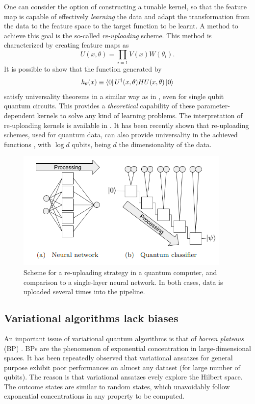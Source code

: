 \documentclass[]{report}
\begin{document}
One can consider the option of constructing a tunable kernel, so that the feature map is capable of effectively \textit{learning} the data and adapt the transformation from the data to the feature space to the target function to be learnt. A method to achieve this goal is the so-called \textit{re-uploading} scheme. This method is characterized by creating feature maps as
\begin{equation}
U(x, \theta) = \prod_{i = 1} V(x) W(\theta_i). 
\end{equation}
It is possible to show that the function generated by
\begin{equation}
h_\theta(x) \equiv \bra 0 U^\dagger(x, \theta) H U(x, \theta) \ket 0 
\end{equation}
satisfy universality theorems in a similar way as in , even for single qubit quantum circuits. This provides a \textit{theoretical} capability of these parameter-dependent kernels to solve any kind of learning problems. The interpretation of re-uploading kernels is available in . It has been recently shown that re-uploading schemes, used for quantum data, can also provide universality in the achieved functions \cite{perez-salinas2024universal}, with $\log d$ qubits, being $d$ the dimensionality of the data. 

\begin{figure}\centering
\includegraphics[width = .7\linewidth]{images/reuploading}
\caption{Scheme for a re-uploading strategy in a quantum computer, and comparison to a single-layer neural network. In both cases, data is uploaded several times into the pipeline. }
\label{fig.reuploading}
\end{figure}

\subsection{Variational algorithms lack biases}

An important issue of variational quantum algorithms is that of \textit{barren plateaus} (BP) \cite{mcclean2018barren, larocca2022diagnosing}. BPs are the phenomenon of exponential concentration in large-dimensional spaces. It has been repeatedly observed that variational ansatzes for general purpose exhibit poor performances on almost any dataset (for large number of qubits). The reason is that variational ansatzes evely explore the Hilbert space. The outcome states are similar to random states, which unavoidably follow exponential concentrations in any property to be computed. 
\end{document}
